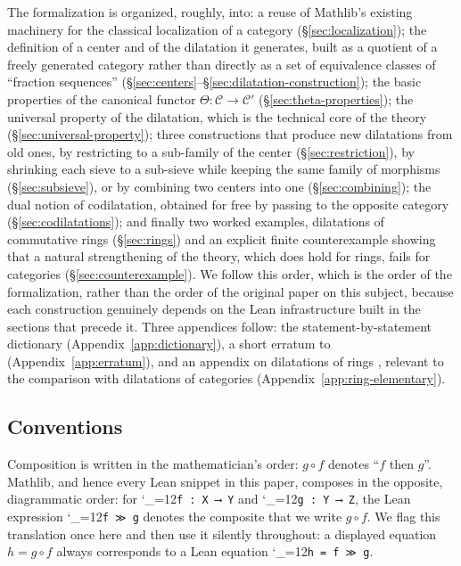 \documentclass[11pt]{amsart}
\newcommand{\lcode}{\begingroup\catcode`\_=12\relax\lcodeInner}
\newcommand{\lcodeInner}[1]{\texttt{#1}\endgroup}
\theoremstyle{plain}
\theoremstyle{definition}
\theoremstyle{remark}
\newcommand{\calC}{\mathcal C}
\begin{document}
The formalization is organized, roughly, into: a reuse of Mathlib's existing machinery for
the classical localization of a category (\S\ref{sec:localization}); the definition of a
center and of the dilatation it generates, built as a quotient of a freely generated category
rather than directly as a set of equivalence classes of ``fraction sequences''
(\S\ref{sec:centers}--\S\ref{sec:dilatation-construction}); the basic properties of the
canonical functor $\Theta : \calC \to \calC'$ (\S\ref{sec:theta-properties}); the universal
property of the dilatation, which is the technical core of the theory
(\S\ref{sec:universal-property}); three constructions that produce new dilatations from old
ones, by restricting to a sub-family of the center (\S\ref{sec:restriction}), by shrinking
each sieve to a sub-sieve while keeping the same family of morphisms (\S\ref{sec:subsieve}),
or by combining two centers into one (\S\ref{sec:combining}); the dual notion of codilatation, obtained
for free by passing to the opposite category (\S\ref{sec:codilatations}); and finally two
worked examples, dilatations of commutative rings (\S\ref{sec:rings}) and an explicit
finite counterexample showing that a natural strengthening of the theory, which does hold for
rings, fails for categories (\S\ref{sec:counterexample}). We follow this order, which is the
order of the formalization, rather than the order of the original paper on this subject,
because each construction genuinely depends on the Lean infrastructure built in the sections
that precede it. Three appendices follow: the statement-by-statement dictionary
(Appendix~\ref{app:dictionary}), a short erratum to \citep{Mayeux}
(Appendix~\ref{app:erratum}), and an appendix on dilatations of rings \citep{M}, relevant to
the comparison with dilatations of categories (Appendix~\ref{app:ring-elementary}).

\subsection{Conventions}
\label{sec:conventions}

Composition is written in the mathematician's order: $g\circ f$ denotes ``$f$ then $g$''.
Mathlib, and hence every Lean snippet in this paper, composes in the opposite, diagrammatic
order: for \lcode{f : X ⟶ Y} and \lcode{g : Y ⟶ Z}, the Lean expression \lcode{f ≫ g} denotes
the composite that we write $g \circ f$. We flag this translation once here and then use it
silently throughout: a displayed equation $h = g\circ f$ always corresponds to a Lean
equation \lcode{h = f ≫ g}.
\end{document}
